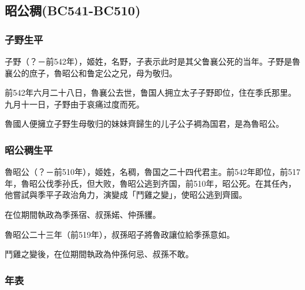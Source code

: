 
\subsection{昭公稠{\tiny(BC541-BC510)}}

\subsubsection{子野生平}

子野（？－前542年），姬姓，名野，子表示此时是其父鲁襄公死的当年。子野是魯襄公的庶子，魯昭公和鲁定公之兄，母为敬归。

前542年六月二十八日，魯襄公去世，鲁国人拥立太子子野即位，住在季氏那里。九月十一日，子野由于哀痛过度而死。

魯國人便擁立子野生母敬归的妹妹齊歸生的儿子公子裯為国君，是為魯昭公。

\subsubsection{昭公稠生平}

魯昭公（？－前510年），姬姓，名稠，魯国之二十四代君主。前542年即位，前517年，魯昭公伐季孙氏，但大败，魯昭公逃到齐国，前510年，昭公死。在其任內，他嘗試與季平子政治角力，演變成「鬥雞之變」，使昭公逃到齊國。

在位期間執政為季孫宿、叔孫婼、仲孫貜。

魯昭公二十三年（前519年），叔孫昭子將魯政讓位給季孫意如。

鬥雞之變後，在位期間執政為仲孫何忌、叔孫不敢。

\subsubsection{年表}

